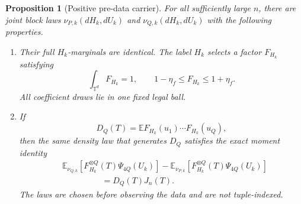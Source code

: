 \documentclass[11pt]{article}
\newtheorem{proposition}[proposition]{Proposition}
\newcommand{\E}{\mathbb{E}}
\newcommand{\Torus}{\mathbb{T}}
\begin{document}
\begin{proposition}[Positive pre-data carrier]
\label{B:prop:carrier}
For all sufficiently large \(n\), there are joint block laws
\(\nu_{P,k}(dH_k,dU_k)\) and \(\nu_{Q,k}(dH_k,dU_k)\) with the following
properties.

\begin{enumerate}
\item Their full \(H_k\)-marginals are identical.  The label \(H_k\)
selects a factor \(F_{H_k}\) satisfying
\begin{equation}
 \int_{\Torus^d}F_{H_k}=1,
 \qquad
 1-\eta_f\le F_{H_k}\le1+\eta_f.
 \label{B:eq:local-density-factor}
\end{equation}
All coefficient draws lie in one fixed legal ball.

\item If
\begin{equation}
 D_Q(T)=\E F_{H_k}(u_1)\cdots F_{H_k}(u_Q),
 \label{B:eq:DQ}
\end{equation}
then the same density law that generates \(D_Q\) satisfies the exact moment
identity
\begin{align}
 &\E_{\nu_{Q,k}}
 \left[F_{H_k}^{\otimes Q}(T)\Psi_{4Q}(U_k)\right]
 -\E_{\nu_{P,k}}
 \left[F_{H_k}^{\otimes Q}(T)\Psi_{4Q}(U_k)\right]
 \nonumber\\
 &\hspace{2cm}=D_Q(T)J_n(T).
 \label{B:eq:master-moment}
\end{align}
The laws are chosen before observing the data and are not tuple-indexed.
\end{enumerate}
\end{proposition}
\end{document}
